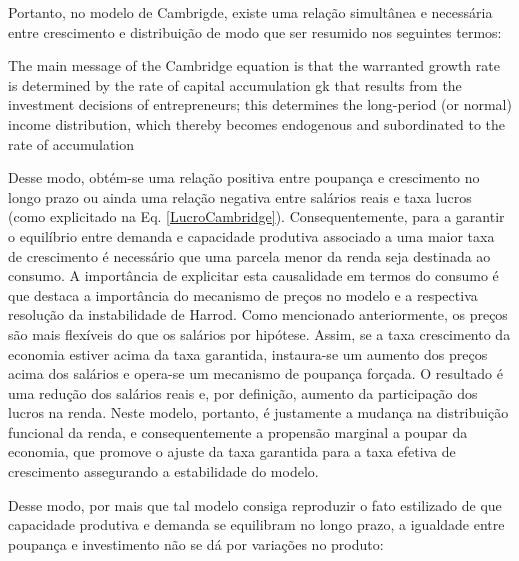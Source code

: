 Portanto, no modelo de Cambrigde, existe uma relação simultânea e necessária entre crescimento e distribuição de modo que ser resumido nos seguintes termos:

\begin{citacao}
The main message of the Cambridge
equation is that the warranted growth rate is determined by the rate of capital
accumulation gk that results from the investment decisions of entrepreneurs; this
determines the long-period (or normal) income distribution, which thereby
becomes endogenous and subordinated to the rate of accumulation \cite[p.~158]{cesaratto_neo-kaleckian_2015}
\end{citacao}
Desse modo, obtém-se uma relação positiva entre poupança e crescimento no longo prazo ou ainda uma relação negativa entre salários reais e taxa lucros (como explicitado na Eq. \ref{LucroCambridge}). Consequentemente, para a garantir o equilíbrio entre demanda e capacidade produtiva associado a uma maior taxa de crescimento é necessário que uma parcela menor da renda seja destinada ao consumo. A importância de explicitar esta causalidade em termos do consumo é que destaca a importância do mecanismo de preços no modelo e a respectiva resolução da instabilidade de Harrod. Como mencionado anteriormente, os preços são mais flexíveis do que os salários por hipótese. Assim, se a taxa crescimento da economia estiver acima da taxa garantida, instaura-se um aumento dos preços acima dos salários e opera-se um mecanismo de poupança forçada. O resultado é uma redução dos salários reais e, por definição, aumento da participação dos lucros na renda.  Neste modelo, portanto, é justamente a mudança na distribuição funcional da renda, e consequentemente a propensão marginal a poupar da economia, que promove o ajuste da taxa garantida para a taxa efetiva de crescimento assegurando a estabilidade do modelo.

Desse modo, por mais que tal modelo consiga reproduzir o fato estilizado de que capacidade produtiva e demanda se equilibram no longo prazo, a igualdade entre poupança e investimento não se dá por variações no produto:

